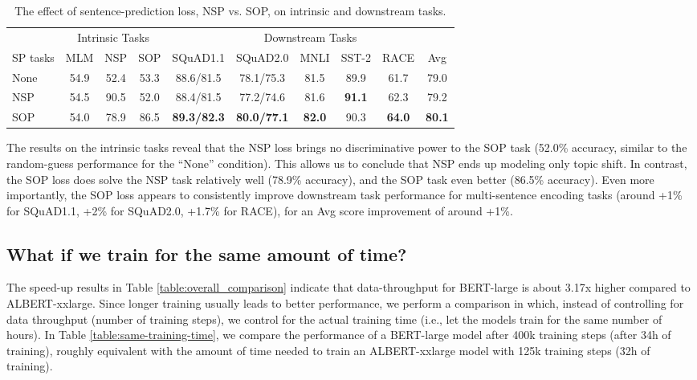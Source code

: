 \begin{table}[!htbp] 
\small
\centering
\begin{tabular}{ l | c c c | c c c c  c | c }
&\multicolumn{3}{|c|}{Intrinsic Tasks} & \multicolumn{6}{c}{Downstream Tasks} \\
SP tasks	    	&MLM	&NSP & SOP &SQuAD1.1	&SQuAD2.0	&MNLI	&SST-2	&RACE & Avg \\
\hline
None &54.9 &52.4 & 53.3 &88.6/81.5	&78.1/75.3	&81.5	&89.9	&61.7		& 79.0 \\
NSP	 &54.5 &90.5 & 52.0 &88.4/81.5	&77.2/74.6	&81.6	&\textbf{91.1}	&62.3	& 79.2  \\
SOP	 &54.0 &78.9 &86.5  &\textbf{89.3/82.3}	&\textbf{80.0/77.1}	&\textbf{82.0}	&90.3	&\textbf{64.0}	 & \textbf{80.1}	\\
\end{tabular}
\caption{The effect of sentence-prediction loss, NSP vs. SOP, on intrinsic and downstream tasks.}
\label{table:sop}
\end{table}

The results on the intrinsic tasks reveal that the NSP loss brings no discriminative power to the SOP task (52.0\% accuracy, similar to the random-guess performance for the ``None'' condition).
This allows us to conclude that NSP ends up modeling only topic shift.
In contrast, the SOP loss does solve the NSP task relatively well (78.9\% accuracy), and the SOP task even better (86.5\% accuracy).
Even more importantly, the SOP loss appears to consistently improve downstream task performance for multi-sentence encoding tasks (around +1\% for SQuAD1.1, +2\% for SQuAD2.0, +1.7\% for RACE), for an Avg score improvement of around +1\%.

\subsection{What if we train for the same amount of time?}

The speed-up results in Table \ref{table:overall_comparison} indicate that data-throughput for BERT-large is about 3.17x higher compared to ALBERT-xxlarge.
Since longer training usually leads to better performance, we perform a comparison in which, instead of controlling for data throughput (number of training steps), we control for the actual training time (i.e., let the models train for the same number of hours).
In Table \ref{table:same-training-time}, we compare the performance of a  BERT-large model after 400k training steps (after 34h of training), roughly equivalent with the amount of time needed to train an ALBERT-xxlarge model with 125k training steps (32h of training).


